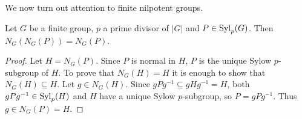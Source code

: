 %

%
%
%


We now turn out attention to finite nilpotent groups. 

\begin{lemma}
	\label{lem:normalizador}
	Let $G$ be a finite group, $p$ a prime divisor of $|G|$ and 
	$P\in\mathrm{Syl}_p(G)$. Then
	$N_G(N_G(P))=N_G(P)$. 
\end{lemma}

\begin{proof}
	Let $H=N_G(P)$. Since $P$ is normal in $H$, $P$ is the unique Sylow 
	$p$-subgroup of $H$. To prove that $N_G(H)=H$ it is enough to show that $N_G(H)\subseteq
	H$. Let $g\in N_G(H)$. Since  
	$gPg^{-1}\subseteq gHg^{-1}=H$, 
	both 
	$gPg^{-1}\in\mathrm{Syl}_p(H)$ and $H$ have a unique Sylow $p$-subgroup, so   
	$P=gPg^{-1}$. Thus $g\in N_G(P)=H$. 
\end{proof}

